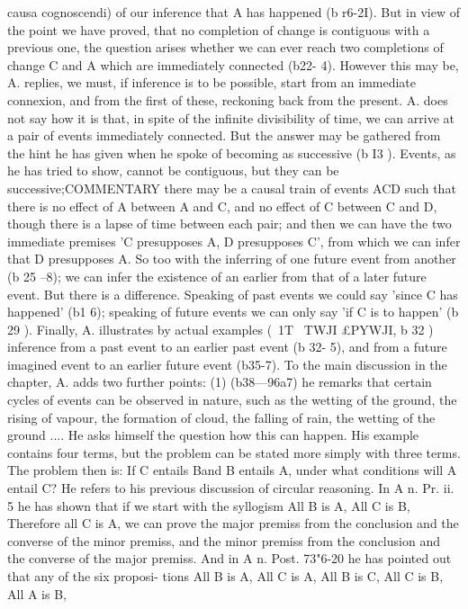 {{{{{{{{{{{{{{{{{{{{{{{{{{{{{{{{{{{{{{{{{{{{{{{{{{{{{{{{{{{{{{causa cognoscendi) of our inference that A has happened (b r6-2I).
But in view of the point we have proved, that no completion of
change is contiguous with a previous one, the question arises
whether we can ever reach two completions of change C and A
which are immediately connected (b22- 4). However this may be,
A. replies, we must, if inference is to be possible, start from an
immediate connexion, and from the first of these, reckoning back
from the present.
A. does not say how it is that, in spite of the infinite divisibility
of time, we can arrive at a pair of events immediately connected.
But the answer may be gathered from the hint he has given
when he spoke of becoming as successive (b I3 ). Events, as he has
tried to show, cannot be contiguous, but they can be successive;COMMENTARY
there may be a causal train of events ACD such that there is no
effect of A between A and C, and no effect of C between C and
D, though there is a lapse of time between each pair; and then
we can have the two immediate premises 'C presupposes A,
D presupposes C', from which we can infer that D presupposes A.
So too with the inferring of one future event from another
(b 25 --8); we can infer the existence of an earlier from that of a
later future event. But there is a difference. Speaking of past
events we could say 'since C has happened' (b1 6); speaking of
future events we can only say 'if C is to happen' (b 29 ).
Finally, A. illustrates by actual examples (~1T~ TWJI £PYWJI, b 32 )
inference from a past event to an earlier past event (b 32- 5), and
from a future imagined event to an earlier future event (b35-7).
To the main discussion in the chapter, A. adds two further
points: (1) (b38---96a7) he remarks that certain cycles of events
can be observed in nature, such as the wetting of the ground,
the rising of vapour, the formation of cloud, the falling of rain,
the wetting of the ground .... He asks himself the question how
this can happen. His example contains four terms, but the
problem can be stated more simply with three terms. The
problem then is: If C entails Band B entails A, under what
conditions will A entail C? He refers to his previous discussion
of circular reasoning. In A n. Pr. ii. 5 he has shown that if we
start with the syllogism All B is A, All C is B, Therefore all C
is A, we can prove the major premiss from the conclusion and
the converse of the minor premiss, and the minor premiss from
the conclusion and the converse of the major premiss. And in
A n. Post. 73"6-20 he has pointed out that any of the six proposi-
tions All B is A, All C is A, All B is C, All C is B, All A is B,
}}}}}}}}}}}}}}}}}}}}}}}}}}}}}}}}}}}}}}}}}}}}}}}}}}}}}}}}}}}}}}
